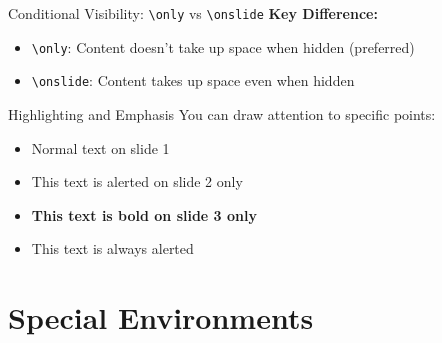\documentclass[aspectratio=169]{beamer}
\begin{document}
\begin{frame}{Conditional Visibility: \texttt{\textbackslash only} vs \texttt{\textbackslash onslide}}
  \textbf{Key Difference:}
  \begin{itemize}
    \item \texttt{\textbackslash only}: Content doesn't take up space when hidden (preferred)
    \item \texttt{\textbackslash onslide}: Content takes up space even when hidden
  \end{itemize}
  
  \vspace{0.5cm}
  
  
  \vspace{0.5cm}
  
\end{frame}

\begin{frame}{Highlighting and Emphasis}
  You can draw attention to specific points:
  
  \begin{itemize}
    \item<1-> Normal text on slide 1
    \item<2-> \alert<2>{This text is alerted on slide 2 only}
    \item<3-> \textbf<3>{This text is bold on slide 3 only}
    \item<4-> \alert{This text is always alerted}
  \end{itemize}
  
  \vspace{0.5cm}
  
\end{frame}

\section{Special Environments}
\end{document}
